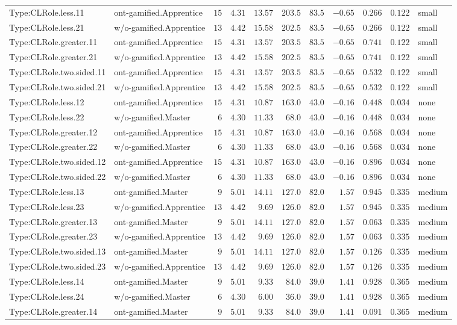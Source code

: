 \documentclass[6pt,a4paper]{article}
\begin{document}
{\begin{longtable}{llrrrrrrrrl}
Type:CLRole.less.11&ont-gamified.Apprentice&$15$&$4.31$&$13.57$&$203.5$&$ 83.5$&$-0.65$&$0.266$&$0.122$&small\tabularnewline
Type:CLRole.less.21&w/o-gamified.Apprentice&$13$&$4.42$&$15.58$&$202.5$&$ 83.5$&$-0.65$&$0.266$&$0.122$&small\tabularnewline
Type:CLRole.greater.11&ont-gamified.Apprentice&$15$&$4.31$&$13.57$&$203.5$&$ 83.5$&$-0.65$&$0.741$&$0.122$&small\tabularnewline
Type:CLRole.greater.21&w/o-gamified.Apprentice&$13$&$4.42$&$15.58$&$202.5$&$ 83.5$&$-0.65$&$0.741$&$0.122$&small\tabularnewline
Type:CLRole.two.sided.11&ont-gamified.Apprentice&$15$&$4.31$&$13.57$&$203.5$&$ 83.5$&$-0.65$&$0.532$&$0.122$&small\tabularnewline
Type:CLRole.two.sided.21&w/o-gamified.Apprentice&$13$&$4.42$&$15.58$&$202.5$&$ 83.5$&$-0.65$&$0.532$&$0.122$&small\tabularnewline
Type:CLRole.less.12&ont-gamified.Apprentice&$15$&$4.31$&$10.87$&$163.0$&$ 43.0$&$-0.16$&$0.448$&$0.034$&none\tabularnewline
Type:CLRole.less.22&w/o-gamified.Master&$ 6$&$4.30$&$11.33$&$ 68.0$&$ 43.0$&$-0.16$&$0.448$&$0.034$&none\tabularnewline
Type:CLRole.greater.12&ont-gamified.Apprentice&$15$&$4.31$&$10.87$&$163.0$&$ 43.0$&$-0.16$&$0.568$&$0.034$&none\tabularnewline
Type:CLRole.greater.22&w/o-gamified.Master&$ 6$&$4.30$&$11.33$&$ 68.0$&$ 43.0$&$-0.16$&$0.568$&$0.034$&none\tabularnewline
Type:CLRole.two.sided.12&ont-gamified.Apprentice&$15$&$4.31$&$10.87$&$163.0$&$ 43.0$&$-0.16$&$0.896$&$0.034$&none\tabularnewline
Type:CLRole.two.sided.22&w/o-gamified.Master&$ 6$&$4.30$&$11.33$&$ 68.0$&$ 43.0$&$-0.16$&$0.896$&$0.034$&none\tabularnewline
Type:CLRole.less.13&ont-gamified.Master&$ 9$&$5.01$&$14.11$&$127.0$&$ 82.0$&$ 1.57$&$0.945$&$0.335$&medium\tabularnewline
Type:CLRole.less.23&w/o-gamified.Apprentice&$13$&$4.42$&$ 9.69$&$126.0$&$ 82.0$&$ 1.57$&$0.945$&$0.335$&medium\tabularnewline
Type:CLRole.greater.13&ont-gamified.Master&$ 9$&$5.01$&$14.11$&$127.0$&$ 82.0$&$ 1.57$&$0.063$&$0.335$&medium\tabularnewline
Type:CLRole.greater.23&w/o-gamified.Apprentice&$13$&$4.42$&$ 9.69$&$126.0$&$ 82.0$&$ 1.57$&$0.063$&$0.335$&medium\tabularnewline
Type:CLRole.two.sided.13&ont-gamified.Master&$ 9$&$5.01$&$14.11$&$127.0$&$ 82.0$&$ 1.57$&$0.126$&$0.335$&medium\tabularnewline
Type:CLRole.two.sided.23&w/o-gamified.Apprentice&$13$&$4.42$&$ 9.69$&$126.0$&$ 82.0$&$ 1.57$&$0.126$&$0.335$&medium\tabularnewline
Type:CLRole.less.14&ont-gamified.Master&$ 9$&$5.01$&$ 9.33$&$ 84.0$&$ 39.0$&$ 1.41$&$0.928$&$0.365$&medium\tabularnewline
Type:CLRole.less.24&w/o-gamified.Master&$ 6$&$4.30$&$ 6.00$&$ 36.0$&$ 39.0$&$ 1.41$&$0.928$&$0.365$&medium\tabularnewline
Type:CLRole.greater.14&ont-gamified.Master&$ 9$&$5.01$&$ 9.33$&$ 84.0$&$ 39.0$&$ 1.41$&$0.091$&$0.365$&medium\tabularnewline

\end{longtable}}
\end{document}
